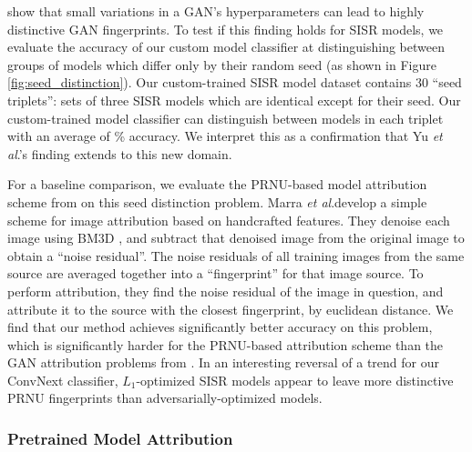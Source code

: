 \documentclass[10pt]{article} %
\newcommand{\etal}{\textit{et al}.}
\begin{document}
\cite{yu2019attributing} show that small variations in a GAN's hyperparameters can lead to highly distinctive GAN fingerprints. To test if this finding holds for SISR models, we evaluate the accuracy of our custom model classifier at distinguishing between groups of models which differ only by their random seed (as shown in Figure \ref{fig:seed_distinction}). Our custom-trained SISR model dataset contains 30 ``seed triplets'': sets of three SISR models which are identical except for their seed. Our custom-trained model classifier can distinguish between models in each triplet with an average of \valDistinctionBetweenSeedAccMean\% accuracy. We interpret this as a confirmation that Yu \etal's finding extends to this new domain. 

For a baseline comparison, we evaluate the PRNU-based model attribution scheme from \cite{marra2018gans} on this seed distinction problem.
Marra \etal develop a simple scheme for image attribution based on handcrafted features. They denoise each image using BM3D \citep{Dabov2007Image}, and subtract that denoised image from the original image to obtain a ``noise residual''. The noise residuals of all training images from the same source are averaged together into a ``fingerprint'' for that image source. To perform attribution, they find the noise residual of the image in question, and attribute it to the source with the closest fingerprint, by euclidean distance. We find that our method achieves significantly better accuracy on this problem, which is significantly harder for the PRNU-based attribution scheme than the GAN attribution problems from \citep{marra2018gans}. In an interesting reversal of a trend for our ConvNext classifier, $L_1$-optimized SISR models appear to leave more distinctive PRNU fingerprints than adversarially-optimized models.

\subsubsection{Pretrained Model Attribution}
\end{document}
